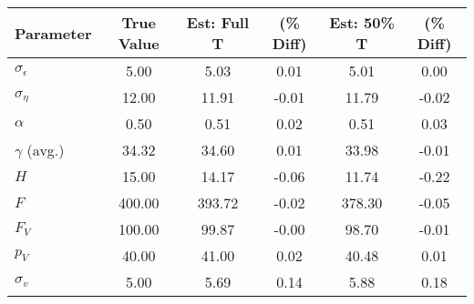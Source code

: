 \begin{tabular}{lccccc}

Parameter & True Value & Est: Full T & (\% Diff)  & Est: 50\% T & (\% Diff) \\
\hline
\hline
$\sigma_{\epsilon}$&5.00&5.03&0.01&5.01&0.00\\
$\sigma_{\eta}$&12.00&11.91&-0.01&11.79&-0.02\\
$\alpha$&0.50&0.51&0.02&0.51&0.03\\
$\gamma$ (avg.)&34.32&34.60&0.01&33.98&-0.01\\
$H$&15.00&14.17&-0.06&11.74&-0.22\\
$F$&400.00&393.72&-0.02&378.30&-0.05\\
$F_V$&100.00&99.87&-0.00&98.70&-0.01\\
$p_V$&40.00&41.00&0.02&40.48&0.01\\
$\sigma_v$&5.00&5.69&0.14&5.88&0.18\\
\hline
\end{tabular}
